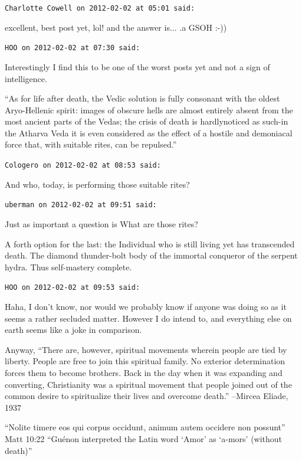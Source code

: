 \begin{footnotesize}
\begin{sffamily}
\texttt{Charlotte Cowell on 2012-02-02 at 05:01 said:}

excellent, best post yet, lol! and the answer is... .a GSOH :-))

\hfill

\texttt{HOO on 2012-02-02 at 07:30 said:}

Interestingly I find this to be one of the worst posts yet and not a sign of intelligence.

``As for life after death, the Vedic solution is fully consonant with the oldest Aryo-Hellenic spirit: images of obscure hells are almost entirely absent from the most ancient parts of the Vedas; the crisis of death is hardlynoticed as such-in the Atharva Veda it is even considered as the effect of a hostile and demoniacal force that, with suitable rites, can be repulsed.''

\hfill

\texttt{Cologero on 2012-02-02 at 08:53 said:}

And who, today, is performing those suitable rites?

\hfill

\texttt{uberman on 2012-02-02 at 09:51 said:}

Just as important a question is What are those rites?

A forth option for the last: the Individual who is still living yet has transcended death. The diamond thunder-bolt body of the immortal conqueror of the serpent hydra. Thus self-mastery complete.

\hfill

\texttt{HOO on 2012-02-02 at 09:53 said:}

Haha, I don't know, nor would we probably know if anyone was doing so as it seems a rather secluded matter. However I do intend to, and everything else on earth seems like a joke in comparison.

Anyway, ``There are, however, spiritual movements wherein people are tied by liberty. People are free to join this spiritual family. No exterior determination forces them to become brothers. Back in the day when it was expanding and converting, Christianity was a spiritual movement that people joined out of the common desire to spiritualize their lives and overcome death.'' --Mircea Eliade, 1937

``Nolite timere eos qui corpus occidunt, animum autem occidere non possunt'' Matt 10:22 ``Guénon interpreted the Latin word `Amor' as `a-mors' (without death)''


\end{sffamily}
\end{footnotesize}
